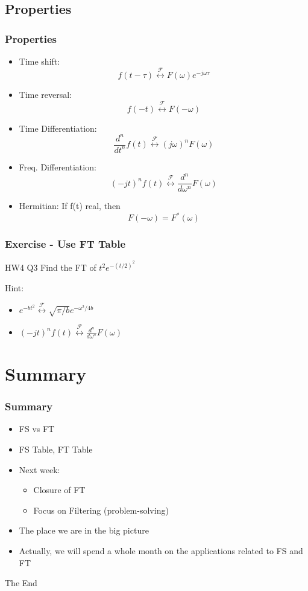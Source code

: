 \documentclass{beamer}
\begin{document}
\subsection{Properties}


\begin{frame}
   \frametitle{Properties} 
   \begin{itemize}       
       \item Time shift: \[ f(t - \tau) \stackrel{\mathscr{F}}{\longleftrightarrow} F(\omega) e^{-j \omega \tau}   \]
       \item Time reversal: \[ f(-t) \stackrel{\mathscr{F}}{\longleftrightarrow} F(-\omega)
           \]
       \item Time Differentiation: \[ \frac{d^n}{dt^n} f(t) \stackrel{\mathscr{F}}{\longleftrightarrow} (j\omega)^n F(\omega)
           \]
        \item Freq. Differentiation: \[ (-jt)^nf(t) \stackrel{\mathscr{F}}{\longleftrightarrow} \frac{d^n}{d\omega^n} F(\omega)
            \] 
        \item Hermitian: If f(t) real, then \[  F(-\omega) = F^*(\omega) \]
   \end{itemize}
\end{frame}

\begin{frame}[t]
    \frametitle{Exercise - Use FT Table}
    \begin{block}{HW4 Q3}
        Find the FT of $t^2 e^{-(t/2)^2}$
    \end{block}
    Hint: 
    \begin{itemize}
        \item $ e^{-bt^2} \stackrel{\mathscr{F}}{\longleftrightarrow} \sqrt{\pi/b} e^{-\omega^2/4b}  $ 
        \item $ (-jt)^nf(t) \stackrel{\mathscr{F}}{\longleftrightarrow} \frac{d^n}{d\omega^n} F(\omega) $
    \end{itemize}

\end{frame}

\section{Summary}
\begin{frame}
    \frametitle{Summary}
    \begin{itemize}
        \item FS vs FT
        \item FS Table, FT Table
        \item Next week: 
        \begin{itemize}
            \item Closure of FT
            \item Focus on Filtering (problem-solving)
        \end{itemize}
        \item The place we are in the big picture
        \item Actually, we will spend a whole month on the applications related to FS and FT
    \end{itemize}
\end{frame}


\begin{frame}
\Huge{\centerline{The End}}
\end{frame}

\end{document}
